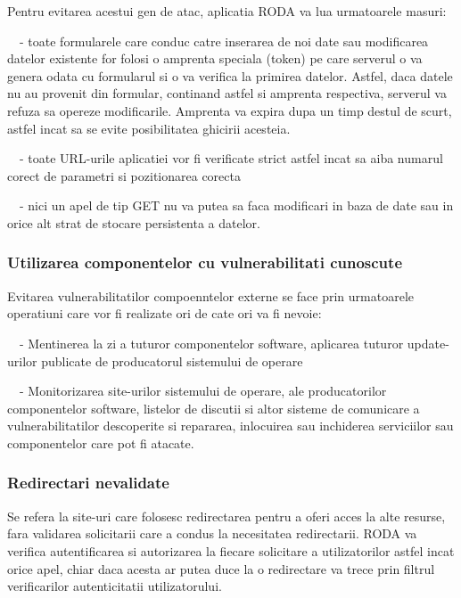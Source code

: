 Pentru evitarea acestui gen de atac, aplicatia RODA va lua urmatoarele masuri:

{\sffamily\color{black}
\ \ {}- toate formularele care conduc catre inserarea de noi date sau modificarea datelor existente for folosi o
amprenta speciala (token) pe care serverul o va genera odata cu formularul si o va verifica la primirea datelor.
Astfel, daca datele nu au provenit din formular, continand astfel si amprenta respectiva, serverul va refuza sa opereze
modificarile. Amprenta va expira dupa un timp destul de scurt, astfel incat sa se evite posibilitatea ghicirii
acesteia. }

{\sffamily\color{black}
\ \ {}- toate URL-urile aplicatiei vor fi verificate strict astfel incat sa aiba
numarul corect de parametri si pozitionarea corecta}

{\sffamily\color{black}
\ \ {}- nici un apel de tip GET nu va putea sa faca modificari in baza de date sau in orice alt strat de stocare
persistenta a datelor. }

\subsubsection{Utilizarea componentelor cu vulnerabilitati cunoscute}

Evitarea vulnerabilitatilor compoenntelor externe se face prin urmatoarele operatiuni care vor fi realizate ori de cate
ori va fi nevoie:

{\sffamily\color{black}
\ \ {}- Mentinerea la zi a tuturor componentelor software, aplicarea tuturor update-urilor publicate de producatorul
sistemului de operare}

{\sffamily\color{black}
\ \ {}- Monitorizarea site-urilor sistemului de operare, ale producatorilor componentelor software, listelor de discutii
si altor sisteme de comunicare a vulnerabilitatilor descoperite si repararea, inlocuirea sau inchiderea serviciilor sau
componentelor care pot fi atacate. }

\subsubsection{Redirectari nevalidate }

Se refera la site-uri care folosesc redirectarea pentru a oferi acces la alte resurse, fara validarea solicitarii care a
condus la necesitatea redirectarii. RODA va verifica autentificarea si autorizarea la fiecare solicitare a
utilizatorilor astfel incat orice apel, chiar daca acesta ar putea duce la o redirectare va trece prin filtrul
verificarilor autenticitatii utilizatorului.
